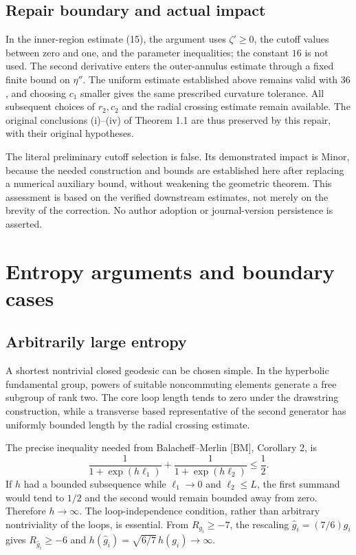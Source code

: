 \documentclass[10pt]{article}
\begin{document}
\subsection*{Repair boundary and actual impact}
In the inner-region estimate (15), the argument uses \(\zeta'\geq0\), the cutoff values between zero and one, and the parameter inequalities; the constant \(16\) is not used. The second derivative enters the outer-annulus estimate through a fixed finite bound on \(\eta''\). The uniform estimate established above remains valid with \(36\), and choosing \(c_1\) smaller gives the same prescribed curvature tolerance. All subsequent choices of \(r_2,c_2\) and the radial crossing estimate remain available. The original conclusions (i)–(iv) of Theorem 1.1 are thus preserved by this repair, with their original hypotheses.\par
The literal preliminary cutoff selection is false. Its demonstrated impact is Minor, because the needed construction and bounds are established here after replacing a numerical auxiliary bound, without weakening the geometric theorem. This assessment is based on the verified downstream estimates, not merely on the brevity of the correction. No author adoption or journal-version persistence is asserted.\par
\section*{Entropy arguments and boundary cases}
\subsection*{Arbitrarily large entropy}
A shortest nontrivial closed geodesic can be chosen simple. In the hyperbolic fundamental group, powers of suitable noncommuting elements generate a free subgroup of rank two. The core loop length tends to zero under the drawstring construction, while a transverse based representative of the second generator has uniformly bounded length by the radial crossing estimate.\par
The precise inequality needed from Balacheff–Merlin [BM], Corollary 2, is \[\frac1{1+\exp(h\ell_1)}+\frac1{1+\exp(h\ell_2)}\leq\frac12.\] If \(h\) had a bounded subsequence while \(\ell_1\to0\) and \(\ell_2\leq L\), the first summand would tend to \(1/2\) and the second would remain bounded away from zero. Therefore \(h\to\infty\). The loop-independence condition, rather than arbitrary nontriviality of the loops, is essential. From \(R_{g_i}\geq-7\), the rescaling \(\widehat g_i=(7/6)g_i\) gives \(R_{\widehat g_i}\geq-6\) and \(h(\widehat g_i)=\sqrt{6/7}\,h(g_i)\to\infty\).\par
\end{document}
